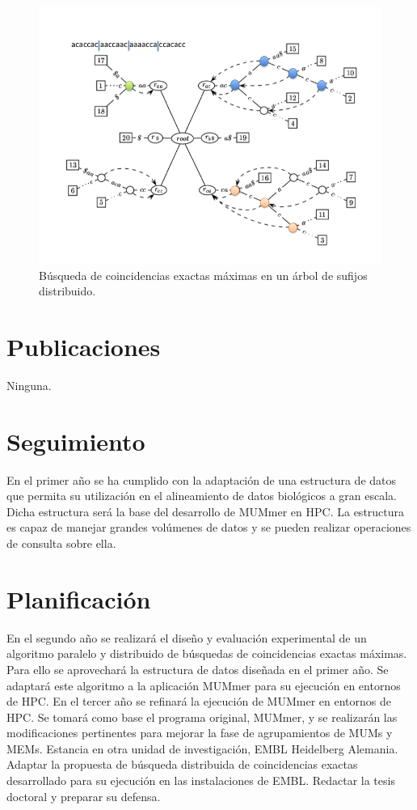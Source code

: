 \documentclass[12pt,a4paper]{article}
\begin{document}
\begin{figure}[h] 
\begin{center}
\includegraphics[scale=0.4]{dst_search.png}
\caption{Búsqueda de coincidencias exactas máximas en un árbol de sufijos distribuido.}
\label{fig:dst_search}
\end{center}
\end{figure}

\section{Publicaciones}
\noindent
Ninguna.
\section{Seguimiento}
En el primer año se ha cumplido con la adaptación de una estructura de datos que permita su utilización
en el alineamiento de datos biológicos a gran escala. Dicha estructura será la base del desarrollo de MUMmer en HPC.
La estructura es capaz de manejar grandes volúmenes de datos y se pueden realizar operaciones de consulta sobre ella.
\section{Planificación}
En el segundo año se realizará el diseño y evaluación experimental de un algoritmo paralelo y distribuido de búsquedas de 
coincidencias exactas máximas. Para ello se aprovechará la estructura de datos diseñada en el primer año. Se adaptará este
algoritmo a la aplicación MUMmer para su ejecución en entornos de HPC.
En el tercer año se refinará la ejecución de MUMmer en entornos de HPC. Se tomará como base el programa original, MUMmer, y 
se realizarán las modificaciones pertinentes para mejorar la fase de agrupamientos de MUMs y MEMs. Estancia en otra unidad 
de investigación, EMBL Heidelberg Alemania. Adaptar la propuesta de búsqueda distribuida de coincidencias exactas desarrollado para su
ejecución en las instalaciones de EMBL. Redactar la tesis doctoral y preparar su defensa.
\end{document}
